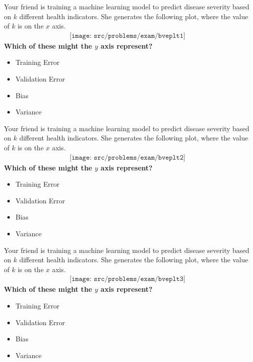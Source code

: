 \documentclass[preview]{standalone}
\begin{document}
\begin{Parts}
	

\Part Your friend is training a machine learning model to predict
disease severity based on $k$ different health indicators. She generates the following plot, where the value of $k$ is on the $x$ axis.
\begin{align*}
\texttt{[image: src/problems/exam/bveplt1]}
\end{align*}
{\bf Which of these might the $y$ axis represent?}
\begin{multicols}{2}
	\begin{itemize}
		\item[\mcqb]Training Error
		\item[\mcqb]Validation Error
		\item[\mcqb]Bias
		\item[\mcqb]Variance
	\end{itemize}
\end{multicols}



\ifexamnosol
\vspace{2in}
\fi
\Part Your friend is training a machine learning model to predict
disease severity based on $k$ different health indicators.
She generates the following plot, where the value of $k$ is on the $x$ axis.
\begin{align*}
\texttt{[image: src/problems/exam/bveplt2]}
\end{align*}
{\bf Which of these might the $y$ axis represent?}
\begin{multicols}{2}
	\begin{itemize}
		\item[\mcqb]Training Error
		\item[\mcqb]Validation Error
		\item[\mcqb]Bias
		\item[\mcqb]Variance
	\end{itemize}
\end{multicols}



\Part Your friend is training a machine learning model to predict
disease severity based on $k$ different health indicators.
She generates the following plot, where the value of $k$ is on the $x$ axis.
\begin{align*}
\texttt{[image: src/problems/exam/bveplt3]}
\end{align*}
{\bf Which of these might the $y$ axis represent?}
\begin{multicols}{2}
	\begin{itemize}
		\item[\mcqb] Training Error
		\item[\mcqb] Validation Error
		\item[\mcqb] Bias
		\item[\mcqb]Variance
	\end{itemize}
\end{multicols}




\end{Parts}
\end{document}
